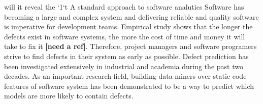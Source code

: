 \documentclass{sig-alternative}
\begin{document}
will it reveal the `1`t
A standard approach to software analutics
Software has becoming a large and complex system and delivering reliable and quality 
software is imperative for development teams. Empirical study shows that the longer the 
defects exist in software systems, the more the cost of time and money it will take to fix it 
\textbf{ [need a ref]}. Therefore, project managers and software programers strive to find 
defects in their system as early as possible. Defect prediction has been investigated 
extensively in industrial and academia during the past two decades. As an important research 
field, building data miners  \cite{lessmann2008benchmarking, mccabe1976complexity, 
menzies2007data, menzies2010defect, jiang2008can, menzies2011local, song2011general} 
over static code features of software system has been demonstrated to be a way to predict 
which models are more likely to contain defects.
\end{document}
